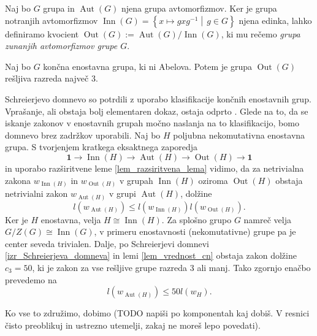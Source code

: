 \begin{definicija}
\label{def_grupa_zunanjih_avtomorfizmov}
Naj bo $G$ grupa in $\operatorname{Aut}(G)$ njena grupa avtomorfizmov. Ker je grupa notranjih avtomorfizmov $\operatorname{Inn}(G) = \left\{ x \mapsto g x g^{-1}  \middle|\,  g \in G  \right\}$ njena edinka,
lahko definiramo kvocient $\operatorname{Out}(G) :=  \operatorname{Aut}(G)  /  \operatorname{Inn}(G)$, ki mu rečemo \emph{grupa zunanjih avtomorfizmov grupe $G$}. 
\end{definicija}

\begin{izrek}
\label{izr_Schreierjeva_domneva}
 Naj bo $G$ končna enostavna grupa, ki ni Abelova. Potem je grupa $\operatorname{Out}(G)$ rešljiva razreda največ $3$.
\end{izrek}

Schreierjevo domnevo so potrdili z uporabo klasifikacije končnih enostavnih grup. Vprašanje, ali obstaja bolj elementaren dokaz, ostaja odprto \cite[str.~133]{Dixon_Mortimer_1996}.  
Glede na to, da se iskanje zakonov v enostavnih grupah močno naslanja na to klasifikacijo, bomo domnevo brez zadržkov uporabili. Naj bo $H$ poljubna nekomutativna enostavna grupa. 
S tvorjenjem kratkega eksaktnega zaporedja \begin{equation*}
    \mathbf{1} \to \operatorname{Inn}(H)  \to \operatorname{Aut}(H)  \to  \operatorname{Out}(H)  \to  \mathbf{1}
\end{equation*}  
in uporabo razširitvene leme \ref{lem_razsiritvena_lema} vidimo, da za netrivialna zakona $w_{\operatorname{Inn}(H) }$ in $w_{\operatorname{Out}(H) }$ v grupah $\operatorname{Inn}(H) $ oziroma $\operatorname{Out}(H) $ obstaja netrivialni zakon $w_{\operatorname{Aut}(H) }$ v grupi $\operatorname{Aut}(H) $, dolžine \begin{equation*}
    l(w_{\operatorname{Aut}(H) }) \le  l(w_{\operatorname{Inn}(H) }) l (w_{ \operatorname{Out}(H) }).
    \end{equation*}    
Ker je $H$ enostavna, velja $H \cong \operatorname{Inn}(H)$. Za splošno grupo $G$ namreč velja $ G / Z(G) \cong \operatorname{Inn}(G)$, v primeru enostavnosti (nekomutativne) grupe pa je center seveda trivialen. Dalje, po Schreierjevi domnevi \ref{izr_Schreierjeva_domneva} in lemi \ref{lem_vrednost_cn} obstaja zakon dolžine $c_3 = 50$, ki je zakon za vse rešljive grupe razreda $3$ ali manj.
Tako zgornjo enačbo prevedemo na \begin{equation*}
    l(w_{\operatorname{Aut}(H) }) \le  50 l(w_H).
\end{equation*}  


Ko vse to združimo, dobimo (TODO napiši po komponentah kaj dobiš. V resnici čisto preoblikuj in ustrezno utemelji, zakaj ne moreš lepo povedati).
